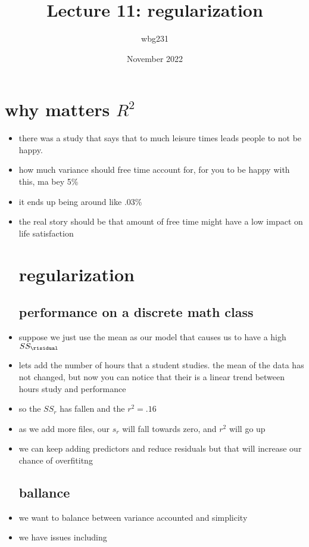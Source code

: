 \documentclass{article}
\title{Lecture 11: regularization }
\author{wbg231 }
\date{November 2022}
\begin{document}
\maketitle

\section{why matters $R^2$}
\begin{itemize}
\item there was a study that says that to much leisure times leads people to not be happy.
\item how much variance should free time account for, for you to be happy with this, ma bey 5\% 
\item it ends up being around like .03\%
\item the real story should be that amount of free time might have a low impact on life satisfaction 

\section{regularization}
\subsection{performance on a discrete math class}
\item suppose we just use the mean as our model 
\itme that causes us to have a high $SS_{\risidual}$
\item lets add the number of hours that a student studies. the mean of the data has not changed, but now you can notice that their is a linear trend between hours study and performance \item so the $SS_r$ has fallen and the $r^2=.16$
\item as we add more files, our $s_{r}$ will fall towards zero, and $r^2$ will go up
\item we can keep adding predictors and reduce residuals but that will increase our chance  of overfititng 
\subsection{ballance }
\item we want to balance between variance accounted and simplicity
\item we have issues including 

\end{itemize}
\end{document}

